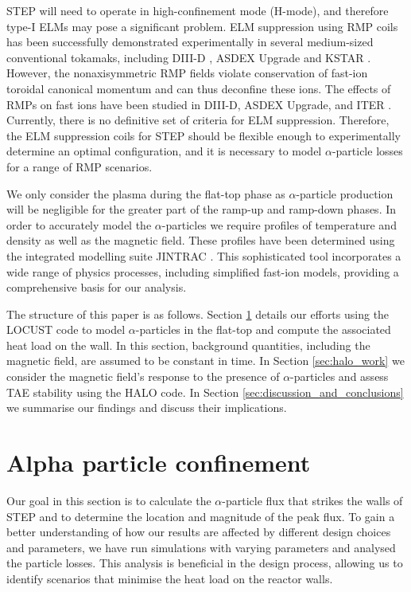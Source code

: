 \documentclass[10pt, a4paper, twoside]{article}
\begin{document}
STEP will need to operate in high-confinement mode (H-mode), and therefore type-I ELMs may pose a significant problem. ELM suppression using RMP coils has been successfully demonstrated experimentally in several medium-sized conventional tokamaks, including DIII-D \cite{Evans2008}, ASDEX Upgrade \cite{suttrop2018} and KSTAR \cite{In2019}. However, the nonaxisymmetric RMP fields violate conservation of fast-ion toroidal canonical momentum and can thus deconfine these ions. The effects of RMPs on fast ions have been studied in DIII-D, ASDEX Upgrade, and ITER \cite{van2015,sanchis2018,ward2022}. Currently, there is no definitive set of criteria for ELM suppression. Therefore, the ELM suppression coils for STEP should be flexible enough to experimentally determine an optimal configuration, and it is necessary to model $\alpha$-particle losses for a range of RMP scenarios.

We only consider the plasma during the flat-top phase as $\alpha$-particle production will be negligible for the greater part of the ramp-up and ramp-down phases. In order to accurately model the $\alpha$-particles we require profiles of temperature and density as well as the magnetic field. These profiles have been determined using the integrated modelling suite JINTRAC \cite{meyer2023, mitchell2023}. This sophisticated tool incorporates a wide range of physics processes, including simplified fast-ion models, providing a comprehensive basis for our analysis.

The structure of this paper is as follows. Section \ref{sec:locust_work} details our efforts using the LOCUST code to model $\alpha$-particles in the flat-top and compute the associated heat load on the wall. In this section, background quantities, including the magnetic field, are assumed to be constant in time. In Section \ref{sec:halo_work} we consider the magnetic field's response to the presence of $\alpha$-particles and assess TAE stability using the HALO code. In Section \ref{sec:discussion_and_conclusions} we summarise our findings and discuss their implications.

\section{Alpha particle confinement}
\label{sec:locust_work}

Our goal in this section is to calculate the $\alpha$-particle flux that strikes the walls of STEP and to determine the location and magnitude of the peak flux. To gain a better understanding of how our results are affected by different design choices and parameters, we have run simulations with varying parameters and analysed the particle losses. This analysis is beneficial in the design process, allowing us to identify scenarios that minimise the heat load on the reactor walls.
\end{document}
